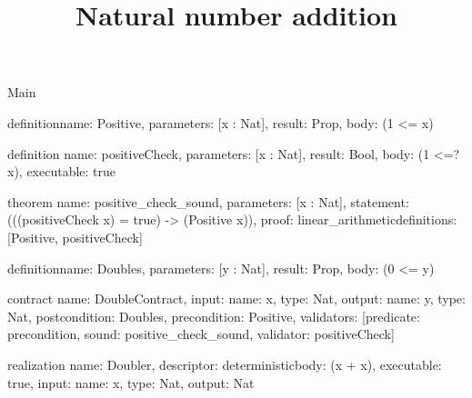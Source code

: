 \begin{lexlean}{Main}
\title{Natural number addition}
\begin{semanticmodule}
definition{name: Positive, parameters: [x : Nat], result: Prop, body: (1 <= x)}

definition{
  name: positiveCheck,
  parameters: [x : Nat],
  result: Bool,
  body: (1 <=? x),
  executable: true
}

theorem{
  name: positive_check_sound,
  parameters: [x : Nat],
  statement: (((positiveCheck x) = true) -> (Positive x)),
  proof: linear_arithmetic{definitions: [Positive, positiveCheck]}
}

definition{name: Doubles, parameters: [y : Nat], result: Prop, body: (0 <= y)}

contract{
  name: DoubleContract,
  input: {name: x, type: Nat},
  output: {name: y, type: Nat},
  postcondition: Doubles,
  precondition: Positive,
  validators: [{predicate: precondition, sound: positive_check_sound, validator: positiveCheck}]
}

realization{
  name: Doubler,
  descriptor: deterministic{body: (x + x)},
  executable: true,
  input: {name: x, type: Nat},
  output: Nat
}
\end{semanticmodule}
\end{lexlean}
